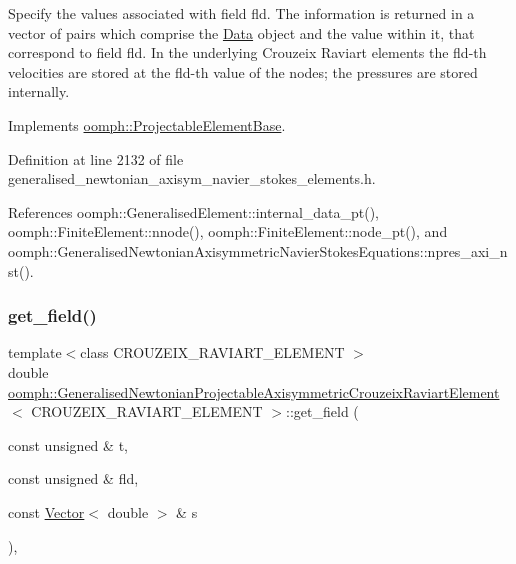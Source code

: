 Specify the values associated with field fld. The information is returned in a vector of pairs which comprise the \hyperlink{classoomph_1_1Data}{Data} object and the value within it, that correspond to field fld. In the underlying Crouzeix Raviart elements the fld-\/th velocities are stored at the fld-\/th value of the nodes; the pressures are stored internally. 



Implements \hyperlink{classoomph_1_1ProjectableElementBase_a644306ebdf16f334344c2d27d72f18b7}{oomph\+::\+Projectable\+Element\+Base}.



Definition at line 2132 of file generalised\+\_\+newtonian\+\_\+axisym\+\_\+navier\+\_\+stokes\+\_\+elements.\+h.



References oomph\+::\+Generalised\+Element\+::internal\+\_\+data\+\_\+pt(), oomph\+::\+Finite\+Element\+::nnode(), oomph\+::\+Finite\+Element\+::node\+\_\+pt(), and oomph\+::\+Generalised\+Newtonian\+Axisymmetric\+Navier\+Stokes\+Equations\+::npres\+\_\+axi\+\_\+nst().

\mbox{\label{classoomph_1_1GeneralisedNewtonianProjectableAxisymmetricCrouzeixRaviartElement_a4340dbe3df28791ddda0fa21f154f33a}} 
\subsubsection{\texorpdfstring{get\+\_\+field()}{get\_field()}}
{\footnotesize\ttfamily template$<$class C\+R\+O\+U\+Z\+E\+I\+X\+\_\+\+R\+A\+V\+I\+A\+R\+T\+\_\+\+E\+L\+E\+M\+E\+NT $>$ \\
double \hyperlink{classoomph_1_1GeneralisedNewtonianProjectableAxisymmetricCrouzeixRaviartElement}{oomph\+::\+Generalised\+Newtonian\+Projectable\+Axisymmetric\+Crouzeix\+Raviart\+Element}$<$ C\+R\+O\+U\+Z\+E\+I\+X\+\_\+\+R\+A\+V\+I\+A\+R\+T\+\_\+\+E\+L\+E\+M\+E\+NT $>$\+::get\+\_\+field (\begin{DoxyParamCaption}\item[{const unsigned \&}]{t,  }\item[{const unsigned \&}]{fld,  }\item[{const \hyperlink{classoomph_1_1Vector}{Vector}$<$ double $>$ \&}]{s }\end{DoxyParamCaption})\hspace{0.3cm}{\ttfamily [inline]}, {\ttfamily [virtual]}}



